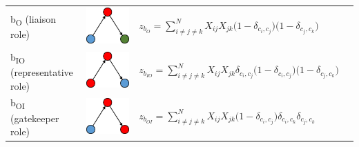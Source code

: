 \begin{table}
{\begin{threeparttable}
\begin{tabular}{l c l l}
b\textsubscript{O} (liaison role) & \begin{minipage}{.12\textwidth} \centering \includegraphics[width=0.4\linewidth]{Images/b_O} \end{minipage} & $z_{b_O} = \sum_{i \neq j \neq k}^N X_{ij} X_{jk} \bigg(1 - \delta_{c_i,c_j} \bigg) \bigg(1 - \delta_{c_j,c_k} \bigg)$ & \\
b\textsubscript{IO} (representative role) & \begin{minipage}{.12\textwidth} \centering \includegraphics[width=0.4\linewidth]{Images/b_IO} \end{minipage} & $z_{b_{IO}} = \sum_{i \neq j \neq k}^N X_{ij} X_{jk} \delta_{c_i,c_j} \bigg(1 - \delta_{c_i,c_j} \bigg) \bigg(1 - \delta_{c_j,c_k} \bigg)$ & \\
b\textsubscript{OI} (gatekeeper role) & \begin{minipage}{.12\textwidth} \centering \includegraphics[width=0.4\linewidth]{Images/b_OI} \end{minipage} & $z_{b_{OI}} = \sum_{i \neq j \neq k}^N X_{ij} X_{jk} \bigg(1 - \delta_{c_i,c_j} \bigg) \delta_{c_i,c_k} \delta_{c_j,c_k}$ & \\

\end{tabular}
\end{threeparttable}}
\end{table}
